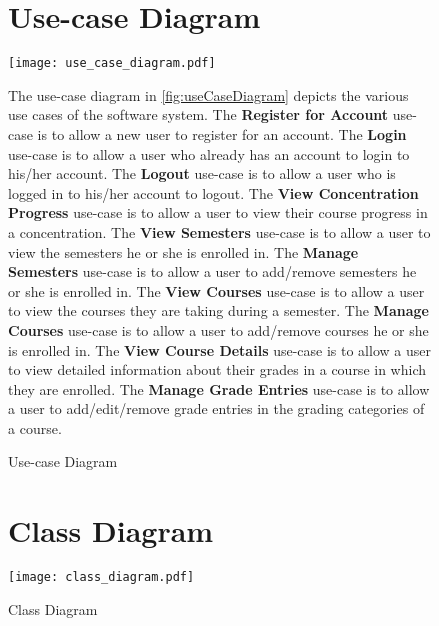 \documentclass[12pt]{article}
\begin{document}


\begin{figure}[p!]
  \section{Use-case Diagram}
  \centering
  \texttt{[image: use\_case\_diagram.pdf]}
  \caption{Use-case Diagram}
  \label{fig:useCaseDiagram}
  \newcommand{\usecaseall}{use-case is to allow }
  \begin{justify}
    The use-case diagram in \autoref{fig:useCaseDiagram} depicts the various use cases of the
    software system. The \textbf{Register for Account} \usecaseall a new user to register for an
    account. The \textbf{Login} \usecaseall a user who already has an account to login to his/her
    account. The \textbf{Logout} \usecaseall a user who is logged in to his/her account to logout.
    The \textbf{View Concentration Progress} \usecaseall a user to view their course progress in a
    concentration. The \textbf{View Semesters} \usecaseall a user to view the semesters he or she is
    enrolled in. The \textbf{Manage Semesters} \usecaseall a user to add/remove semesters he or she
    is enrolled in. The \textbf{View Courses} \usecaseall a user to view the courses they are taking
    during a semester. The \textbf{Manage Courses} \usecaseall a user to add/remove courses he or
    she is enrolled in. The \textbf{View Course Details} \usecaseall a user to view detailed
    information about their grades in a course in which they are enrolled. The \textbf{Manage Grade
    Entries} \usecaseall a user to add/edit/remove grade entries in the grading categories of a
    course.
  \end{justify}
\end{figure}

\clearpage

\begin{figure}[p!]
  \section{Class Diagram}
  \centering
  \texttt{[image: class\_diagram.pdf]}
  \caption{Class Diagram}
  \label{fig:classDiagram}
\end{figure}
\end{document}
